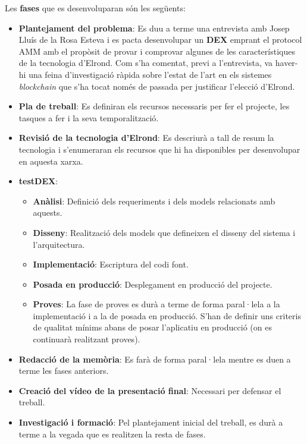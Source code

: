 \documentclass[11pt,a4paper]{article}
\begin{document}
Les \textbf{fases} que es desenvoluparan són les següents:
\begin{itemize}
    \item \textbf{Plantejament del problema}: Es duu a terme una entrevista amb Josep Lluís de la Rosa Esteva i es pacta desenvolupar un \textbf{DEX} emprant el protocol AMM amb el propòsit de provar i comprovar algunes de les característiques de la tecnologia d'Elrond. Com s'ha comentat, previ a l'entrevista, va haver-hi una feina d'investigació ràpida sobre l'estat de l'art en els sistemes \textit{blockchain} que s'ha tocat només de passada per justificar l'elecció d'Elrond.
    \item \textbf{Pla de treball}: Es definiran els recursos necessaris per fer el projecte, les tasques a fer i la seva temporalització.
    \item \textbf{Revisió de la tecnologia d'Elrond}: Es descriurà a tall de resum la tecnologia i s'enumeraran els recursos que hi ha disponibles per desenvolupar en aquesta xarxa.
    \item \textbf{testDEX}:
    \begin{itemize}
    	\item \textbf{Anàlisi}: Definició dels requeriments i dels models relacionats amb aquests. 
    	\item \textbf{Disseny}: Realització dels models que defineixen el disseny del sistema i l'arquitectura.
    	\item \textbf{Implementació}: Escriptura del codi font.
    	\item \textbf{Posada en producció}: Desplegament en producció del projecte.
    	\item \textbf{Proves}: La fase de proves es durà a terme de forma paral·lela a la implementació i a la de posada en producció. S'han de definir uns criteris de qualitat mínims abans de posar l'aplicatiu en producció (on es continuarà realitzant proves).
    \end{itemize}
    \item \textbf{Redacció de la memòria}: Es farà de forma paral·lela mentre es duen a terme les fases anteriors.
    \item \textbf{Creació del vídeo de la presentació final}: Necessari per defensar el treball.
    \item \textbf{Investigació i formació}: Pel plantejament inicial del treball, es durà a terme a la vegada que es realitzen la resta de fases.
\end{itemize}
\end{document}
